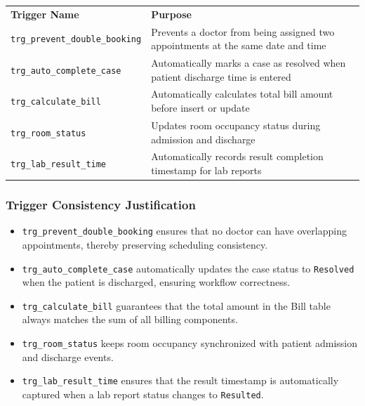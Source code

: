 \documentclass{article}
\newcommand{\theadcell}{\color{white}\bfseries}
\begin{document}
\begin{center}
\renewcommand{\arraystretch}{1.5}
\begin{tabular}{L{5cm} L{8cm}}
 \theadcell Trigger Name & \theadcell Purpose \\

 \texttt{trg\_prevent\_double\_booking} &
Prevents a doctor from being assigned two appointments at the same date and time \\

 \texttt{trg\_auto\_complete\_case} &
Automatically marks a case as resolved when patient discharge time is entered \\

 \texttt{trg\_calculate\_bill} &
Automatically calculates total bill amount before insert or update \\

 \texttt{trg\_room\_status} &
Updates room occupancy status during admission and discharge \\

 \texttt{trg\_lab\_result\_time} &
Automatically records result completion timestamp for lab reports \\
\end{tabular}
\end{center}

\subsubsection{Trigger Consistency Justification}

\begin{itemize}[leftmargin=1.5cm]
    \item \texttt{trg\_prevent\_double\_booking} ensures that no doctor can have overlapping appointments, thereby preserving scheduling consistency.
    
    \item \texttt{trg\_auto\_complete\_case} automatically updates the case status to \texttt{Resolved} when the patient is discharged, ensuring workflow correctness.
    
    \item \texttt{trg\_calculate\_bill} guarantees that the total amount in the Bill table always matches the sum of all billing components.
    
    \item \texttt{trg\_room\_status} keeps room occupancy synchronized with patient admission and discharge events.
    
    \item \texttt{trg\_lab\_result\_time} ensures that the result timestamp is automatically captured when a lab report status changes to \texttt{Resulted}.
\end{itemize}
\newpage
\end{document}
